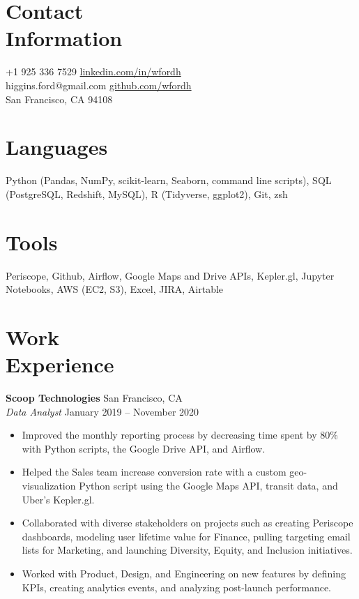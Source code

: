 \documentclass[line, margin]{res}
\begin{document}

\begin{resume}
	
	
\section{Contact \\ Information}
	+1 925 336 7529       \hfill \href{https://linkedin.com/in/wfordh/}{linkedin.com/in/wfordh} \\
	\noindent higgins.ford@gmail.com  \hfill \href{https://github.com/wfordh}{github.com/wfordh} \\
	\noindent San Francisco, CA 94108
	

\section{Languages}
	Python (Pandas, NumPy, scikit-learn, Seaborn, command line scripts), SQL (PostgreSQL, Redshift, MySQL), R (Tidyverse, ggplot2), Git, zsh
	
\section{Tools}
	Periscope, Github, Airflow, Google Maps and Drive APIs, Kepler.gl, Jupyter Notebooks, AWS (EC2, S3), Excel, JIRA, Airtable


\section{Work\\Experience}
	\textbf{Scoop Technologies} \hfill{San Francisco, CA} \vspace{1 mm}\\\vspace{0.5mm}%
	\textsl{Data Analyst} \hfill{January 2019 -- November 2020}\
	\begin{itemize}
		\item Improved the monthly reporting process by decreasing time spent by 80\% with Python scripts, the Google Drive API, and Airflow.
		\item Helped the Sales team increase conversion rate with a custom geo-visualization Python script using the Google Maps API, transit data, and Uber's Kepler.gl.
		\item Collaborated with diverse stakeholders on projects such as creating Periscope dashboards, modeling user lifetime value for Finance, pulling targeting email lists for Marketing, and launching Diversity, Equity, and Inclusion initiatives.
		\item Worked with Product, Design, and Engineering on new features by defining KPIs, creating analytics events, and analyzing post-launch performance.
	\end{itemize}\
	

\end{resume}
\end{document}
